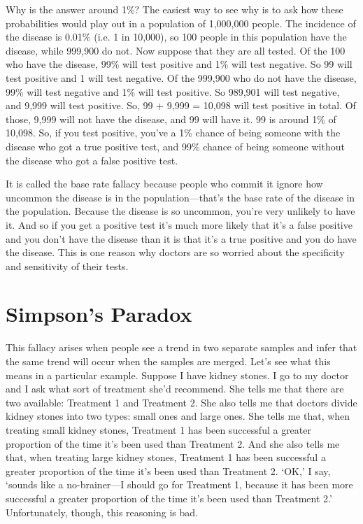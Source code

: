 Why is the answer around 1\%? The easiest way to see why is to ask how these probabilities would play out in a population of 1,000,000 people. The incidence of the disease is 0.01\% (i.e. 1 in 10,000), so 100 people in this population have the disease, while 999,900 do not. Now suppose that they are all tested. Of the 100 who have the disease, 99\% will test positive and 1\% will test negative. So 99 will test positive and 1 will test negative. Of the 999,900 who do not have the disease, 99\% will test negative and 1\% will test positive. So 989,901 will test negative, and 9,999 will test positive. So, 99 + 9,999 = 10,098 will test positive in total. Of those, 9,999 will not have the disease, and 99 will have it. 99 is around 1\% of 10,098. So, if you test positive, you've a 1\% chance of being someone with the disease who got a true positive test, and 99\% chance of being someone without the disease who got a false positive test. 

It is called the base rate fallacy because people who commit it ignore how uncommon the disease is in the population---that's the base rate of the disease in the population. Because the disease is so uncommon, you're very unlikely to have it. And so if you get a positive test it's much more likely that it's a false positive and you don't have the disease than it is that it's a true positive and you do have the disease. This is one reason why doctors are so worried about the specificity and sensitivity of their tests. 

\section{Simpson's Paradox}

This fallacy arises when people see a trend in two separate samples and infer that the same trend will occur when the samples are merged. Let's see what this means in a particular example. Suppose I have kidney stones. I go to my doctor and I ask what sort of treatment she'd recommend. She tells me that there are two available: Treatment 1 and Treatment 2. She also tells me that doctors divide kidney stones into two types: small ones and large ones. She tells me that, when treating small kidney stones, Treatment 1 has been successful a greater proportion of the time it's been used than Treatment 2. And she also tells me that, when treating large kidney stones, Treatment 1 has been successful a greater proportion of the time it's been used than Treatment 2. `OK,' I say, `sounds like a no-brainer---I should go for Treatment 1, because it has been more successful a greater proportion of the time it's been used than Treatment 2.' Unfortunately, though, this reasoning is bad.

